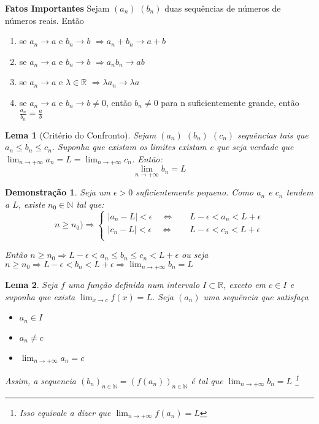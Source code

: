 \documentclass[12pt,openany, letterpaper]{book}
\newtheorem{lemma}{Lema}[section]
\newtheorem{demonstration}{Demonstração}
\begin{document}
\textbf{Fatos Importantes}
\hspace{5mm} Sejam $(a_n)$ $(b_n)$ duas sequências de números de números reais. Então \begin{enumerate}
\item se $a_n \rightarrow a $ e $b_n \rightarrow b$ $\Rightarrow a_n + b_n \rightarrow a + b$
\item se $a_n \rightarrow a $ e $b_n \rightarrow b$ $\Rightarrow a_nb_n \rightarrow ab$
\item se $a_n \rightarrow a $ e $\lambda \in \mathds{R}$ $\Rightarrow \lambda a_n \rightarrow \lambda a$
\item se $a_n \rightarrow a $ e $b_n \rightarrow b \neq 0$, então $b_n \neq 0$ para n suficientemente grande, então $\displaystyle{\frac{a_n}{b_n} = \frac{a}{b}}$
\end{enumerate}

\begin{lemma}[Critério do Confronto]
Sejam $(a_n)$ $(b_n)$ $(c_n)$ sequências tais que $a_n \leq b_n \leq c_n$. Suponha que existam os limites existam e que seja verdade que $\displaystyle{\lim_{n \rightarrow + \infty} a_n = L = \lim_{n \rightarrow + \infty} c_n}$. Então: $$\lim_{n \rightarrow + \infty} b_n = L$$
\end{lemma}

\begin{demonstration}
Seja um $\epsilon > 0$ suficientemente pequeno. Como $a_n$ e  $c_n$ tendem a $L$, existe $n_0 \in \mathds{N}$ tal que:
\[ n \geq n_0) \Rightarrow
  \begin{cases}
    |a_n - L| < \epsilon \quad \Longleftrightarrow  & \quad L - \epsilon < a_n < L +\epsilon \\
    |c_n - L| < \epsilon \quad \Longleftrightarrow  & \quad L - \epsilon < c_n < L +\epsilon \\
  \end{cases}
\]

Então $n \geq n_0 \Rightarrow L - \epsilon < a_n \leq b_n \leq c_n < L + \epsilon$ ou seja $n \geq n_0 \Rightarrow L- \epsilon < b_n < L + \epsilon \Rightarrow \displaystyle{\lim_{n \rightarrow + \infty} b_n = L}$
\end{demonstration}

\begin{lemma}
Seja $f$ uma função definida num intervalo $I \subset \mathds{R}$, exceto em $c \in I$ e suponha que exista $\displaystyle{\lim_{x \rightarrow c} f(x) = L}$. Seja $(a_n)$ uma sequência que satisfaça \begin{itemize}
\item [a.] $a_n \in I$
\item [b.] $a_n \neq c $
\item [c.] $\displaystyle{\lim_{n \rightarrow + \infty} a_n = c} $
\end{itemize}
Assim, a sequencia $(b_n)_{n \in \mathds{N}} =(f(a_n))_{n \in \mathds{N}}$ é tal que $\displaystyle{\lim_{n \rightarrow + \infty} b_n = L}$ \footnote{Isso equivale a dizer que $\displaystyle{\lim_{n \rightarrow + \infty} f(a_n) = L} $}
\end{lemma}
\end{document}
